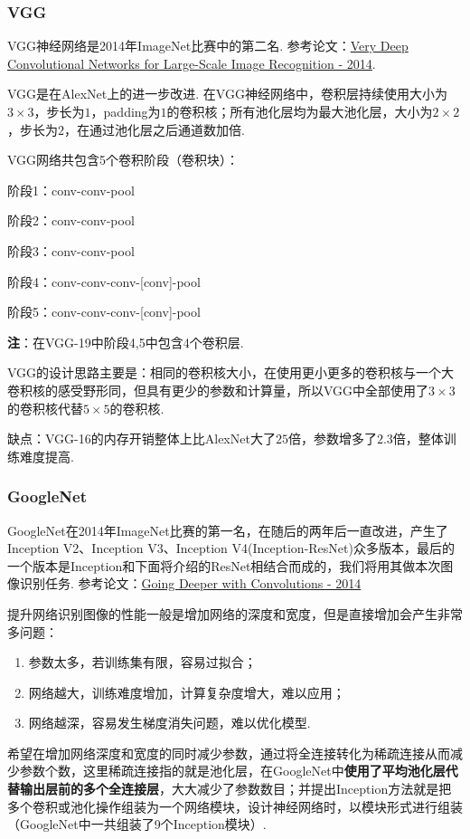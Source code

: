 \documentclass[12pt, a4paper, oneside]{ctexart}
\numberwithin{equation}{section}  %
\begin{document}
\subsubsection{VGG}
VGG神经网络是2014年ImageNet比赛中的第二名. 参考论文：\href{https://arxiv.org/pdf/1409.1556.pdf}{Very Deep Convolutional Networks for Large-Scale Image Recognition - 2014}.

VGG是在AlexNet上的进一步改进. 在VGG神经网络中，卷积层持续使用大小为$3\times 3$，步长为$1$，padding为$1$的卷积核；所有池化层均为最大池化层，大小为$2\times 2$，步长为$2$，在通过池化层之后通道数加倍.


VGG网络共包含5个卷积阶段（卷积块）：

阶段1：conv-conv-pool

阶段2：conv-conv-pool

阶段3：conv-conv-pool

阶段4：conv-conv-conv-[conv]-pool

阶段5：conv-conv-conv-[conv]-pool

\textbf{注}：在VGG-19中阶段4,5中包含4个卷积层.

VGG的设计思路主要是：相同的卷积核大小，在使用更小更多的卷积核与一个大卷积核的感受野形同，但具有更少的参数和计算量，所以VGG中全部使用了$3\times 3$的卷积核代替$5\times 5$的卷积核.

缺点：VGG-16的内存开销整体上比AlexNet大了$25$倍，参数增多了$2.3$倍，整体训练难度提高.

\subsubsection{GoogleNet}
GoogleNet在2014年ImageNet比赛的第一名，在随后的两年后一直改进，产生了Inception V2、Inception V3、Inception V4(Inception-ResNet)众多版本，最后的一个版本是Inception和下面将介绍的ResNet相结合而成的，我们将用其做本次图像识别任务. 参考论文：\href{https://arxiv.org/abs/1409.4842}{Going Deeper with Convolutions - 2014}

提升网络识别图像的性能一般是增加网络的深度和宽度，但是直接增加会产生非常多问题：

\begin{enumerate}
  \item 参数太多，若训练集有限，容易过拟合；
  \item 网络越大，训练难度增加，计算复杂度增大，难以应用；
  \item 网络越深，容易发生梯度消失问题，难以优化模型.
\end{enumerate}

希望在增加网络深度和宽度的同时减少参数，通过将全连接转化为稀疏连接从而减少参数个数，这里稀疏连接指的就是池化层，在GoogleNet中\textbf{使用了平均池化层代替输出层前的多个全连接层}，大大减少了参数数目；并提出Inception方法就是把多个卷积或池化操作组装为一个网络模块，设计神经网络时，以模块形式进行组装（GoogleNet中一共组装了9个Inception模块）.
\end{document}
